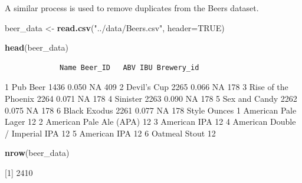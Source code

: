 \documentclass[]{article}
\newenvironment{Shaded}{\begin{snugshade}}{\end{snugshade}}
\newcommand{\KeywordTok}[1]{\textcolor[rgb]{0.13,0.29,0.53}{\textbf{#1}}}
\newcommand{\DataTypeTok}[1]{\textcolor[rgb]{0.13,0.29,0.53}{#1}}
\newcommand{\StringTok}[1]{\textcolor[rgb]{0.31,0.60,0.02}{#1}}
\newcommand{\OtherTok}[1]{\textcolor[rgb]{0.56,0.35,0.01}{#1}}
\newcommand{\NormalTok}[1]{#1}
\begin{document}
A similar process is used to remove duplicates from the Beers dataset.

\begin{Shaded}
\begin{Highlighting}[]
\NormalTok{beer_data <-}\StringTok{ }\KeywordTok{read.csv}\NormalTok{(}\StringTok{"../data/Beers.csv"}\NormalTok{, }\DataTypeTok{header=}\OtherTok{TRUE}\NormalTok{)}

\KeywordTok{head}\NormalTok{(beer_data)}
\end{Highlighting}
\end{Shaded}

\begin{verbatim}
             Name Beer_ID   ABV IBU Brewery_id
\end{verbatim}

1 Pub Beer 1436 0.050 NA 409 2 Devil's Cup 2265 0.066 NA 178 3 Rise of
the Phoenix 2264 0.071 NA 178 4 Sinister 2263 0.090 NA 178 5 Sex and
Candy 2262 0.075 NA 178 6 Black Exodus 2261 0.077 NA 178 Style Ounces 1
American Pale Lager 12 2 American Pale Ale (APA) 12 3 American IPA 12 4
American Double / Imperial IPA 12 5 American IPA 12 6 Oatmeal Stout 12

\begin{Shaded}
\begin{Highlighting}[]
\KeywordTok{nrow}\NormalTok{(beer_data)}
\end{Highlighting}
\end{Shaded}

{[}1{]} 2410
\end{document}
